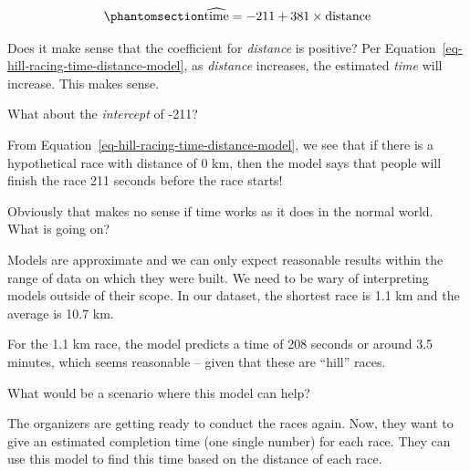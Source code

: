 \documentclass[
  12pt,
  letterpaper,
  DIV=11,
  numbers=noendperiod]{scrreprt}
\begin{document}
\begin{equation}\phantomsection\label{eq-hill-racing-time-distance-model}{
\widehat{\text{time}} = -211 + 381\times \text{distance}
}\end{equation}

Does it make sense that the coefficient for \emph{distance} is positive?
Per Equation~\ref{eq-hill-racing-time-distance-model}, as
\emph{distance} increases, the estimated \emph{time} will increase. This
makes sense.

What about the \emph{intercept} of -211?

From Equation~\ref{eq-hill-racing-time-distance-model}, we see that if
there is a hypothetical race with distance of 0 km, then the model says
that people will finish the race 211 seconds before the race starts!

Obviously that makes no sense if time works as it does in the normal
world. What is going on?

Models are approximate and we can only expect reasonable results within
the range of data on which they were built. We need to be wary of
interpreting models outside of their scope. In our dataset, the shortest
race is 1.1 km and the average is 10.7 km.

For the 1.1 km race, the model predicts a time of 208 seconds or around
3.5 minutes, which seems reasonable -- given that these are ``hill''
races.

\begin{tcolorbox}[enhanced jigsaw, colback=white, leftrule=.75mm, toprule=.15mm, bottomtitle=1mm, breakable, coltitle=black, toptitle=1mm, title={Quick Check}, opacitybacktitle=0.6, colbacktitle=quarto-callout-note-color!10!white, arc=.35mm, left=2mm, colframe=quarto-callout-note-color-frame, titlerule=0mm, rightrule=.15mm, bottomrule=.15mm, opacityback=0]

What would be a scenario where this model can help?

\end{tcolorbox}

\begin{tcolorbox}[enhanced jigsaw, colback=white, leftrule=.75mm, toprule=.15mm, bottomtitle=1mm, breakable, coltitle=black, toptitle=1mm, title={Suggested answer}, opacitybacktitle=0.6, colbacktitle=quarto-callout-note-color!10!white, arc=.35mm, left=2mm, colframe=quarto-callout-note-color-frame, titlerule=0mm, rightrule=.15mm, bottomrule=.15mm, opacityback=0]

The organizers are getting ready to conduct the races again. Now, they
want to give an estimated completion time (one single number) for each
race. They can use this model to find this time based on the distance of
each race.

\end{tcolorbox}
\end{document}
